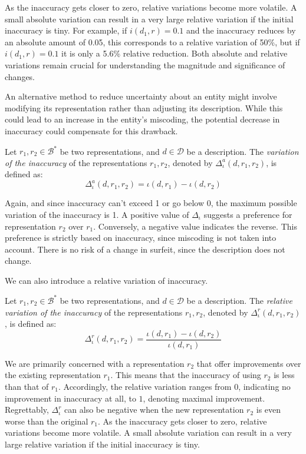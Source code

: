 As the inaccuracy gets closer to zero, relative variations become more volatile. A small absolute variation can result in a very large relative variation if the initial inaccuracy is tiny. For example, if $i(d_1, r) = 0.1$ and the inaccuracy reduces by an absolute amount of 0.05, this corresponds to a relative variation of 50\%, but if $i(d_1, r) = 0.1$ it is only a 5.6\% relative reduction. Both absolute and relative variations remain crucial for understanding the magnitude and significance of changes.

An alternative method to reduce uncertainty about an entity might involve modifying its representation rather than adjusting its description. While this could lead to an increase in the entity's miscoding, the potential decrease in inaccuracy could compensate for this drawback.

\begin{definition}
Let $r_1, r_2 \in \mathcal{B}^\ast$ be two representations, and $d \in \mathcal{D}$ be a description. The \emph{variation of the inaccuracy} of the representations $r_1, r_2$, denoted by $\Delta^{a} _{\iota} ( d, r_1, r_2 )$, is defined as:
\[
\Delta^{a}_{\iota} ( d, r_1, r_2 ) = \iota(d, r_1) - \iota(d, r_2)
\] 
\end{definition}

Again, and since inaccuracy can't exceed 1 or go below 0, the maximum possible variation of the inaccuracy is 1. A positive value of $\Delta_{\iota}$ suggests a preference for representation $r_2$ over $r_1$. Conversely, a negative value indicates the reverse. This preference is strictly based on inaccuracy, since miscoding is not taken into account. There is no risk of a change in surfeit, since the description does not change.

We can also introduce a relative variation of inaccuracy.

\begin{definition}
Let $r_1, r_2 \in \mathcal{B}^\ast$ be two representations, and $d \in \mathcal{D}$ be a description. The \emph{relative variation of the inaccuracy} of the representations $r_1, r_2$, denoted by $\Delta^{r}_{\iota} ( d, r_1, r_2 )$, is defined as:
\[
\Delta^{r}_{\iota} ( d, r_1, r_2 ) = \frac{\iota(d, r_1) - \iota(d, r_2)}{\iota(d, r_1)}
\] 
\end{definition}

We are primarily concerned with a representation $r_2$ that offer improvements over the existing representation $r_1$. This means that the inaccuracy of using $r_2$ is less than that of $r_1$. Accordingly, the relative variation ranges from $0$, indicating no improvement in inaccuracy at all, to $1$, denoting maximal improvement. Regrettably, $\Delta^{r}_{\iota}$ can also be negative when the new representation $r_2$ is even worse than the original $r_1$. As the inaccuracy gets closer to zero, relative variations become more volatile. A small absolute variation can result in a very large relative variation if the initial inaccuracy is tiny.


